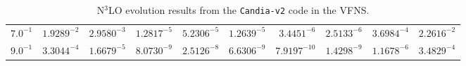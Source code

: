 \begin{table}[htp]
\begin{center}
\begin{tabular}{||c||r|r|r|r|r|r|r|r|r|}
$ 7.0^{-1}$ & $ 1.9289^{-2}$ & $ 2.9580^{-3}$ & $ 1.2817^{-5}$ & $ 5.2306^{-5}$ & $ 1.2639^{-5}$ & $ 3.4451^{-6}$ & $ 2.5133^{-6}$ & $ 3.6984^{-4}$ & $ 2.2616^{-2}$ \\
$ 9.0^{-1}$ & $ 3.3044^{-4}$ & $ 1.6679^{-5}$ & $ 8.0730^{-9}$ & $ 2.5126^{-8}$ & $ 6.6306^{-9}$ & $ 7.9197^{-10}$ & $ 1.4298^{-9}$ & $ 1.1678^{-6}$ & $ 3.4829^{-4}$ \\
\hline \hline
\end{tabular}
\end{center}
\caption{N$^3$LO evolution results from the \texttt{Candia-v2} code in the VFNS.}
\label{tab:n3lo_evolution_results}
\end{table}